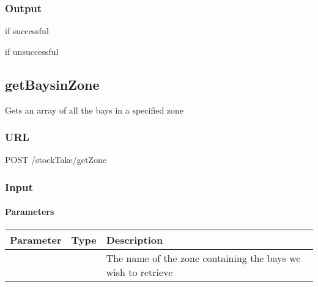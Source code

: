 \documentclass[letterpaper,10pt,english]{sphinxmanual}
\let\oldsubsection\subsection
\renewcommand{\subsection}{\needspace{6\baselineskip}\oldsubsection}
\begin{document}
\subsubsection{Output}
\label{\detokenize{docs/Developer/editZone:output}}
 if successful

 if unsuccessful


\subsection{getBaysinZone}
\label{\detokenize{docs/Developer/getBaysInZone:getbaysinzone}}\label{\detokenize{docs/Developer/getBaysInZone::doc}}
Gets an array of all the bays in a specified zone


\subsubsection{URL}
\label{\detokenize{docs/Developer/getBaysInZone:url}}
\begin{sphinxVerbatim}[commandchars=\\\{\}]
POST /stockTake/getZone
\end{sphinxVerbatim}


\subsubsection{Input}
\label{\detokenize{docs/Developer/getBaysInZone:input}}
\begin{sphinxVerbatim}[commandchars=\\\{\}]
   
\end{sphinxVerbatim}


\paragraph{Parameters}
\label{\detokenize{docs/Developer/getBaysInZone:parameters}}

\begin{savenotes}\sphinxattablestart
\centering
\begin{tabulary}{\linewidth}[t]{|T|T|T|}
\hline
\sphinxstyletheadfamily 
Parameter
&\sphinxstyletheadfamily 
Type
&\sphinxstyletheadfamily 
Description
\\
\hline
{}
&
&
The name of the zone containing the bays we wish to retrieve
\\
\hline
\end{tabulary}
\par
\sphinxattableend\end{savenotes}
\end{document}

